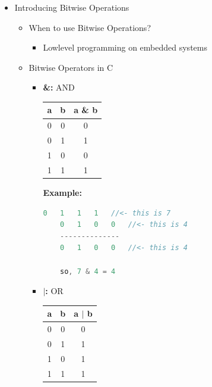 \documentclass[12pt]{article}
\begin{document}
\bigskip

\begin{itemize}
    \item Introducing Bitwise Operations
    \begin{itemize}
        \item When to use Bitwise Operations?
        \begin{itemize}
            \item Lowlevel programming on embedded systems
        \end{itemize}
        \item Bitwise Operators in C
        \begin{itemize}
            \item \textbf{\&:} AND

            \bigskip

            \begin{center}
                \begin{tabular}{|c|c|c|}
                    \hline
                    a & b & a \& b\\
                    \hline
                    0 & 0  & 0 \\
                    0 & 1  & 1 \\
                    1 & 0  & 0 \\
                    1 & 1  & 1 \\
                    \hline
                \end{tabular}
            \end{center}

            \bigskip

            \textbf{Example:}

            \bigskip

    \begin{lstlisting}[language=c]
    0   1   1   1   //<- this is 7
    0   1   0   0   //<- this is 4
    --------------
    0   1   0   0   //<- this is 4

    so, 7 & 4 = 4
    \end{lstlisting}

            \item \textbf{$\mid$:} OR

            \bigskip

            \begin{center}
                \begin{tabular}{|c|c|c|}
                    \hline
                    a & b & a $\mid$ b\\
                    \hline
                    0 & 0  & 0 \\
                    0 & 1  & 1 \\
                    1 & 0  & 1 \\
                    1 & 1  & 1 \\
                    \hline
                \end{tabular}
            \end{center}


\end{itemize}
\end{itemize}
\end{itemize}
\end{document}
